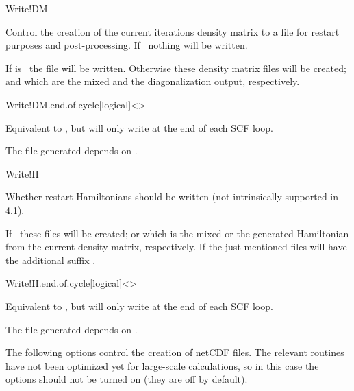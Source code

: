 \begin{fdflogicalT}{Write!DM}

  Control the creation of the current iterations density matrix to a
  file for restart purposes and post-processing. If \fdffalse\ nothing
  will be written.

  If  is \fdffalse\ the  file
  will be written. Otherwise these density matrix files will be
  created;  and  which
  are the mixed and the diagonalization output, respectively.

\end{fdflogicalT}

\begin{fdfentry}{Write!DM.end.of.cycle}[logical]<>

  Equivalent to , but will only write at the end of each
  SCF loop.

  \note The file generated depends on .

\end{fdfentry}  

\begin{fdflogicalF}{Write!H}

  Whether restart Hamiltonians should be written (not intrinsically
  supported in 4.1). 

  If \fdftrue\ these files will be created;  or
   which is the mixed or the generated Hamiltonian from
  the current density matrix, respectively. If
   the just mentioned files will have the
  additional suffix .
  
\end{fdflogicalF}

\begin{fdfentry}{Write!H.end.of.cycle}[logical]<>

  Equivalent to , but will only write at the end of each
  SCF loop.

  \note The file generated depends on .

\end{fdfentry}  

The following options control the creation of netCDF files. The
relevant routines have not been optimized yet for large-scale
calculations, so in this case the options should not be turned on
(they are off by default).


